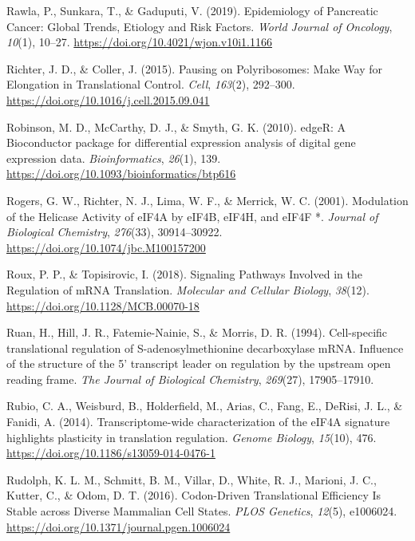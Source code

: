 \documentclass[12pt,openany]{book}
\begin{document}
\hypertarget{ref-Rawla2019}{}
Rawla, P., Sunkara, T., \& Gaduputi, V. (2019). Epidemiology of
Pancreatic Cancer: Global Trends, Etiology and Risk Factors. \emph{World
Journal of Oncology}, \emph{10}(1), 10--27.
\url{https://doi.org/10.4021/wjon.v10i1.1166}

\hypertarget{ref-Richter2015}{}
Richter, J. D., \& Coller, J. (2015). Pausing on Polyribosomes: Make Way
for Elongation in Translational Control. \emph{Cell}, \emph{163}(2),
292--300. \url{https://doi.org/10.1016/j.cell.2015.09.041}

\hypertarget{ref-Robinson2010}{}
Robinson, M. D., McCarthy, D. J., \& Smyth, G. K. (2010). edgeR: A
Bioconductor package for differential expression analysis of digital
gene expression data. \emph{Bioinformatics}, \emph{26}(1), 139.
\url{https://doi.org/10.1093/bioinformatics/btp616}

\hypertarget{ref-Rogers2001}{}
Rogers, G. W., Richter, N. J., Lima, W. F., \& Merrick, W. C. (2001).
Modulation of the Helicase Activity of eIF4A by eIF4B, eIF4H, and eIF4F
*. \emph{Journal of Biological Chemistry}, \emph{276}(33), 30914--30922.
\url{https://doi.org/10.1074/jbc.M100157200}

\hypertarget{ref-Roux2018}{}
Roux, P. P., \& Topisirovic, I. (2018). Signaling Pathways Involved in
the Regulation of mRNA Translation. \emph{Molecular and Cellular
Biology}, \emph{38}(12). \url{https://doi.org/10.1128/MCB.00070-18}

\hypertarget{ref-Ruan1994}{}
Ruan, H., Hill, J. R., Fatemie-Nainie, S., \& Morris, D. R. (1994).
Cell-specific translational regulation of S-adenosylmethionine
decarboxylase mRNA. Influence of the structure of the 5' transcript
leader on regulation by the upstream open reading frame. \emph{The
Journal of Biological Chemistry}, \emph{269}(27), 17905--17910.

\hypertarget{ref-Rubio2014}{}
Rubio, C. A., Weisburd, B., Holderfield, M., Arias, C., Fang, E.,
DeRisi, J. L., \& Fanidi, A. (2014). Transcriptome-wide characterization
of the eIF4A signature highlights plasticity in translation regulation.
\emph{Genome Biology}, \emph{15}(10), 476.
\url{https://doi.org/10.1186/s13059-014-0476-1}

\hypertarget{ref-Rudolph2016}{}
Rudolph, K. L. M., Schmitt, B. M., Villar, D., White, R. J., Marioni, J.
C., Kutter, C., \& Odom, D. T. (2016). Codon-Driven Translational
Efficiency Is Stable across Diverse Mammalian Cell States. \emph{PLOS
Genetics}, \emph{12}(5), e1006024.
\url{https://doi.org/10.1371/journal.pgen.1006024}
\end{document}
